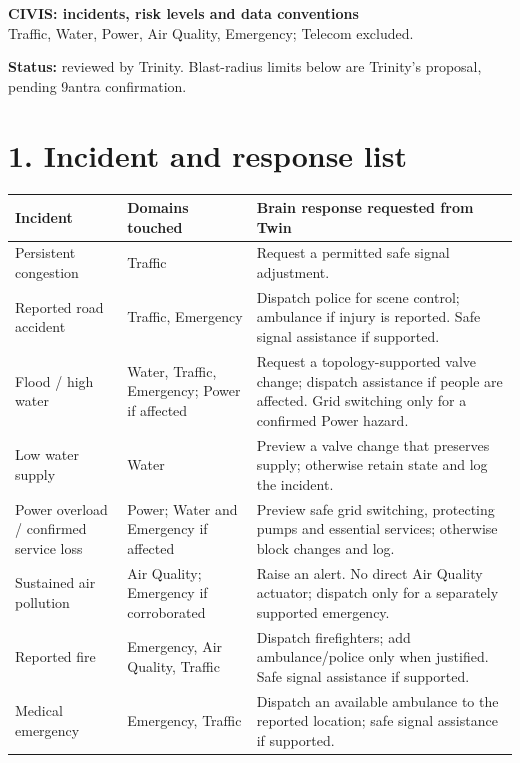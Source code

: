 \documentclass[a4paper,10pt,english]{article}
\begin{document}
\color{black}
\begin{center}
{\Large\bfseries CIVIS: incidents, risk levels and data conventions}\\[3pt]
{\small Traffic, Water, Power, Air Quality, Emergency; Telecom excluded.}
\end{center}
\textbf{Status:} reviewed by Trinity. Blast-radius limits below are Trinity's proposal, pending 9antra confirmation.

\section*{1. Incident and response list}
\begin{tabularx}{\textwidth}{@{}>{\raggedright\arraybackslash}p{}>{\raggedright\arraybackslash}p{}Y@{}}
\toprule\textbf{Incident} & \textbf{Domains touched} & \textbf{Brain response requested from Twin}\\\midrule
Persistent congestion & Traffic & Request a permitted safe signal adjustment.\\[3pt]
Reported road accident & Traffic, Emergency & Dispatch police for scene control; ambulance if injury is reported. Safe signal assistance if supported.\\[3pt]
Flood / high water & Water, Traffic, Emergency; Power if affected & Request a topology-supported valve change; dispatch assistance if people are affected. Grid switching only for a confirmed Power hazard.\\[3pt]
Low water supply & Water & Preview a valve change that preserves supply; otherwise retain state and log the incident.\\[3pt]
Power overload / confirmed service loss & Power; Water and Emergency if affected & Preview safe grid switching, protecting pumps and essential services; otherwise block changes and log.\\[3pt]
Sustained air pollution & Air Quality; Emergency if corroborated & Raise an alert. No direct Air Quality actuator; dispatch only for a separately supported emergency.\\[3pt]
Reported fire & Emergency, Air Quality, Traffic & Dispatch firefighters; add ambulance/police only when justified. Safe signal assistance if supported.\\[3pt]
Medical emergency & Emergency, Traffic & Dispatch an available ambulance to the reported location; safe signal assistance if supported.\\\bottomrule
\end{tabularx}
\end{document}
